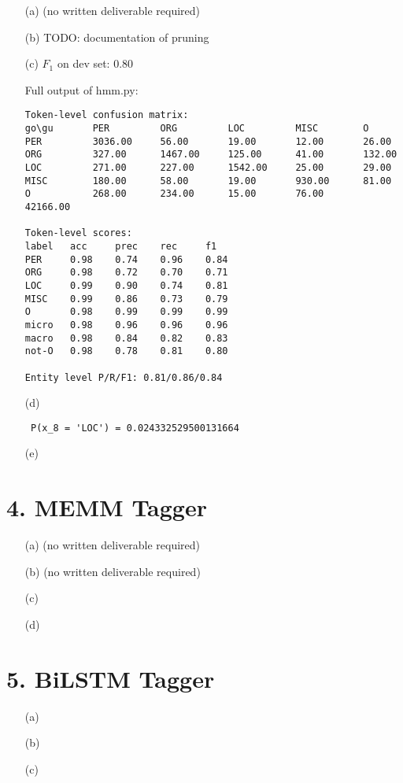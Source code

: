 \documentclass{article}
\begin{document}
\begin{itemize}
    \item[(a)] (no written deliverable required)
    \item[(b)] TODO: documentation of pruning
    \item[(c)] $F_1$ on dev set: 0.80
    
    Full output of hmm.py:

    \begin{verbatim}
Token-level confusion matrix:
go\gu   	PER     	ORG     	LOC     	MISC    	O       
PER     	3036.00 	56.00   	19.00   	12.00   	26.00   
ORG     	327.00  	1467.00 	125.00  	41.00   	132.00  
LOC     	271.00  	227.00  	1542.00 	25.00   	29.00   
MISC    	180.00  	58.00   	19.00   	930.00  	81.00   
O       	268.00  	234.00  	15.00   	76.00   	42166.00

Token-level scores:
label	acc  	prec 	rec  	f1   
PER  	0.98 	0.74 	0.96 	0.84 
ORG  	0.98 	0.72 	0.70 	0.71 
LOC  	0.99 	0.90 	0.74 	0.81 
MISC 	0.99 	0.86 	0.73 	0.79 
O    	0.98 	0.99 	0.99 	0.99 
micro	0.98 	0.96 	0.96 	0.96 
macro	0.98 	0.84 	0.82 	0.83 
not-O	0.98 	0.78 	0.81 	0.80 

Entity level P/R/F1: 0.81/0.86/0.84
    \end{verbatim}

    \item[(d)] \begin{verbatim} P(x_8 = 'LOC') = 0.024332529500131664 \end{verbatim}
    \item[(e)]
\end{itemize}

\section*{4. MEMM Tagger}

\begin{itemize}
    \item[(a)] (no written deliverable required)
    \item[(b)] (no written deliverable required)
    \item[(c)]
    \item[(d)] 
\end{itemize}

\section*{5. BiLSTM Tagger}

\begin{itemize}
    \item[(a)]
    \item[(b)]
    \item[(c)]
\end{itemize}
\end{document}
